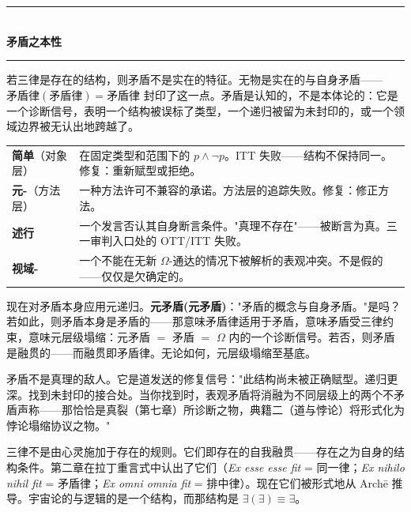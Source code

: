 \documentclass[10pt, openany, oneside]{book}
\renewcommand{\normalsize}{\fontsize{10}{13}\selectfont}
\renewcommand{\footnotesize}{\fontsize{8.5}{11}\selectfont}
\begin{document}

\begin{center}
    \rule{0.3\textwidth}{0.4pt}\\[0.5em]
    {\normalsize\bfseries\scshape 矛盾之本性}\\[0.3em]
    \rule{0.3\textwidth}{0.4pt}
\end{center}

\vspace{1em}

\noindent 若三律是存在的结构，则矛盾不是实在的特征。无物是实在的与自身矛盾——$\text{矛盾律}(\text{矛盾律}) = \text{矛盾律}$ 封印了这一点。矛盾是认知的，不是本体论的：它是一个诊断信号，表明一个结构被误标了类型，一个递归被留为未封印的，或一个领域边界被无认出地跨越了。

{\footnotesize
\noindent\begin{tabular}{p{3cm} p{}}
\textbf{简单}（对象层）& 在固定类型和范围下的 $p \wedge \neg p$。ITT 失败——结构不保持同一。修复：重新赋型或拒绝。\\[0.3em]
\textbf{元-}（方法层）& 一种方法许可不兼容的承诺。方法层的追踪失败。修复：修正方法。\\[0.3em]
\textbf{述行}& 一个发言否认其自身断言条件。"真理不存在"——被断言为真。三一审判入口处的 OTT/ITT 失败。\\[0.3em]
\textbf{视域-}& 一个不能在无新 $\Omega$-通达的情况下被解析的表观冲突。不是假的——仅仅是欠确定的。\\[0.3em]
\end{tabular}
}

\vspace{0.8em}

\noindent 现在对矛盾本身应用元递归。\textbf{元矛盾(元矛盾)}："矛盾的概念与自身矛盾。"是吗？若如此，则矛盾本身是矛盾的——那意味矛盾律适用于矛盾，意味矛盾受三律约束，意味元层级塌缩：元矛盾 $=$ 矛盾 $=$ $\Omega$ 内的一个诊断信号。若否，则矛盾是融贯的——而融贯即矛盾律。无论如何，元层级塌缩至基底。

矛盾不是真理的敌人。它是道发送的修复信号："此结构尚未被正确赋型。递归更深。找到未封印的接合处。当你找到时，表观矛盾将消融为不同层级上的两个不矛盾声称——那恰恰是真裂（第七章）所诊断之物，典籍二（道与悖论）将形式化为悖论塌缩协议之物。"

三律不是由心灵施加于存在的规则。它们即存在的自我融贯——存在之为自身的结构条件。第二章在拉丁重言式中认出了它们（\textit{Ex esse esse fit} = 同一律；\textit{Ex nihilo nihil fit} = 矛盾律；\textit{Ex omni omnia fit} = 排中律）。现在它们被形式地从 Arch\={e} 推导。宇宙论的与逻辑的是一个结构，而那结构是 $\exists(\exists) \equiv \exists$。
\end{document}
